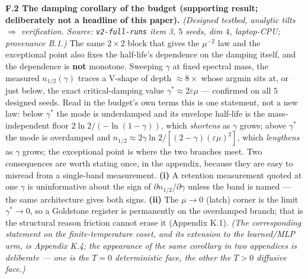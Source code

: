 \documentclass[10pt]{article}
\begin{document}
\medskip
\textbf{F.2 The damping corollary of the budget (supporting result; deliberately not a headline of this paper).} \emph{(Designed testbed, analytic tilts $\Rightarrow$ verification. Source: \texttt{v2-full-runs} item 3, $5$ seeds, dim $4$, laptop-CPU; provenance B.1.)} The same $2\times2$ block that gives the $\mu^{-2}$ law and the exceptional point also fixes the half-life's dependence on the damping itself, and the dependence is \textbf{not} monotone. Sweeping $\gamma$ at fixed spectral mass, the measured $n_{1/2}(\gamma)$ traces a V-shape of depth $\approx8\times$ whose argmin sits at, or just below, the exact critical-damping value $\gamma^*\approx2\varepsilon\mu$ --- confirmed on all $5$ designed seeds. Read in the budget's own terms this is one statement, not a new law: below $\gamma^*$ the mode is underdamped and its envelope half-life is the mass-independent floor $2\ln2/(-\ln(1-\gamma))$, which \emph{shortens} as $\gamma$ grows; above $\gamma^*$ the mode is overdamped and $n_{1/2}\approx2\gamma\ln2/[(2-\gamma)(\varepsilon\mu)^2]$, which \emph{lengthens} as $\gamma$ grows; the exceptional point is where the two branches meet. Two consequences are worth stating once, in the appendix, because they are easy to misread from a single-band measurement. \textbf{(i)} A retention measurement quoted at one $\gamma$ is uninformative about the sign of $\partial n_{1/2}/\partial\gamma$ unless the band is named --- the same architecture gives both signs. \textbf{(ii)} The $\mu\to0$ (latch) corner is the limit $\gamma^*\to0$, so a Goldstone register is permanently on the overdamped branch; that is the structural reason friction cannot erase it (Appendix K.1). \emph{(The corresponding statement on the finite-temperature coset, and its extension to the learned/MLP arm, is Appendix K.4; the appearance of the same corollary in two appendices is deliberate --- one is the $T=0$ deterministic face, the other the $T>0$ diffusive face.)}
\end{document}
